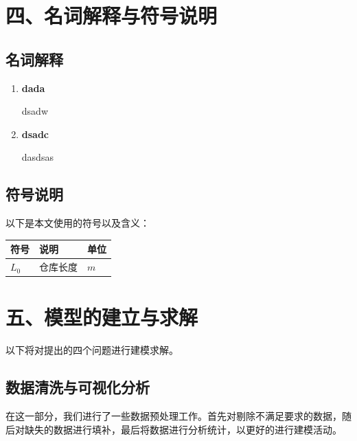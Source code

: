 \documentclass{my_paper}
\begin{document}
\section{四、名词解释与符号说明}
\subsection{名词解释}
\begin{enumerate}
    \item \textbf{dada}
    
    dsadw
    
    \item \textbf{dsadc}
    
    dasdsas

    
\end{enumerate}
\subsection{符号说明}
以下是本文使用的符号以及含义：
\begin{table}[h]%
    \centering
    \begin{tabular}{p{2.0cm}<{\centering}p{9.0cm}<{\centering}p{2.0cm}<{\centering}}
    \hline
    符号 & 说明 & 单位 \\ %
    \hline
    $L_0$ & 仓库长度 &  $m$\\
    
    \hline
    \end{tabular}
\end{table}

\section{五、模型的建立与求解}

以下将对提出的四个问题进行建模求解。
\subsection{数据清洗与可视化分析}
在这一部分，我们进行了一些数据预处理工作。首先对剔除不满足要求的数据，随后对缺失的数据进行填补，最后将数据进行分析统计，以更好的进行建模活动。
\end{document}
